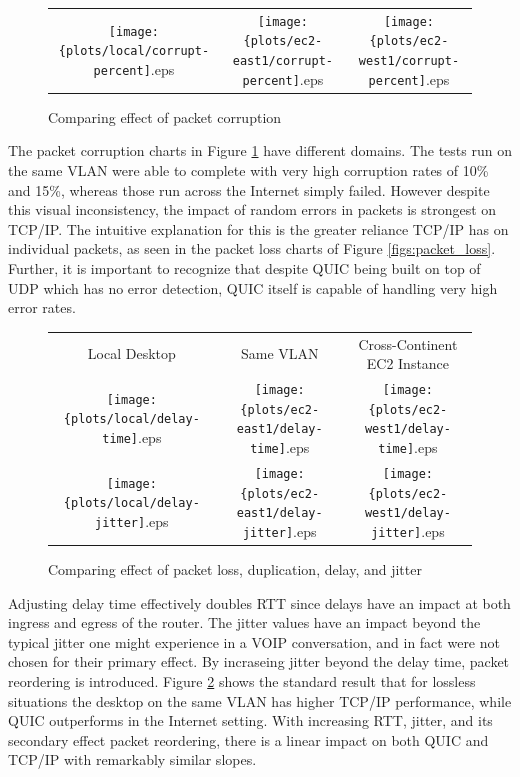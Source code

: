 \documentclass[12pt]{article}
\begin{document}
\begin{figure}[h]
\centering
\begin{tabular}{c c c}
	\texttt{[image: \{plots/local/corrupt-percent]}.eps} &
	\texttt{[image: \{plots/ec2-east1/corrupt-percent]}.eps} &
	\texttt{[image: \{plots/ec2-west1/corrupt-percent]}.eps} \\
\end{tabular}
\caption{Comparing effect of packet corruption}
\label{figs:packet_corruption}
\end{figure}

The packet corruption charts in Figure \ref{figs:packet_corruption} have different domains. The tests run on the same VLAN were able to complete with very high corruption rates of 10\% and 15\%, whereas those run across the Internet simply failed. However despite this visual inconsistency, the impact of random errors in packets is strongest on TCP/IP. The intuitive explanation for this is the greater reliance TCP/IP has on individual packets, as seen in the packet loss charts of Figure \ref{figs:packet_loss}. Further, it is important to recognize that despite QUIC being built on top of UDP which has no error detection, QUIC itself is capable of handling very high error rates.

\begin{figure}[h]
\centering
\begin{tabular}{c c c}
	Local Desktop & Same VLAN & Cross-Continent EC2 Instance \\
	\texttt{[image: \{plots/local/delay-time]}.eps} &
	\texttt{[image: \{plots/ec2-east1/delay-time]}.eps} &
	\texttt{[image: \{plots/ec2-west1/delay-time]}.eps} \\

	\texttt{[image: \{plots/local/delay-jitter]}.eps} &
	\texttt{[image: \{plots/ec2-east1/delay-jitter]}.eps} &
	\texttt{[image: \{plots/ec2-west1/delay-jitter]}.eps} \\
\end{tabular}
\caption{Comparing effect of packet loss, duplication, delay, and jitter}
\label{figs:packet_timing}
\end{figure}

Adjusting delay time effectively doubles RTT since delays have an impact at both ingress and egress of the router. The jitter values have an impact beyond the typical jitter one might experience in a VOIP conversation, and in fact were not chosen for their primary effect. By incraseing jitter beyond the delay time, packet reordering is introduced. Figure \ref{figs:packet_timing} shows the standard result that for lossless situations the desktop on the same VLAN has higher TCP/IP performance, while QUIC outperforms in the Internet setting. With increasing RTT, jitter, and its secondary effect packet reordering, there is a linear impact on both QUIC and TCP/IP with remarkably similar slopes.
\end{document}
